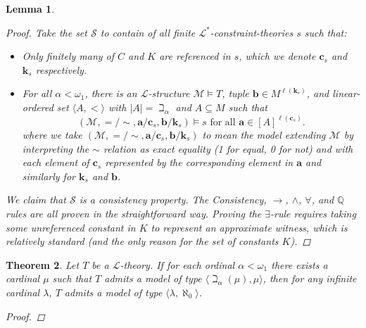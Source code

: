 \documentclass{amsart}
\newtheorem{theorem}{Theorem}[section]
\newtheorem{lemma}[theorem]{Lemma}
\theoremstyle{definition}
\numberwithin{equation}{theorem}
\newcommand{\Q}{\mathbb{Q}}
\newcommand{\V}{\mathbf}
\newcommand{\len}{\ell}
\newcommand{\frag}{\mathcal{L}}
\begin{document}
\begin{lemma}
\begin{proof}
    Take the set $\mathscr{S}$ to contain of all finite $\frag^*$-constraint-theories $s$ such that:
    \begin{itemize}
    \item Only finitely many of $C$ and $K$ are referenced in $s$, which we denote $\V c_s$ and $\V k_s$ respectively.
    \item For all $\alpha<\omega_1$, there is an $\frag$-structure $\mathcal M\models T$, tuple $\V b\in M^{\len(\V k_s)}$, and linear-ordered set $\langle A,<\rangle$ with $|A|=\beth_\alpha$ and $A\subseteq M$ such that 
    \[
      (\mathcal M,{=}/{\sim},\V a/\V c_s, \V b/\V k_s)\models s\text{ for all $\V a\in[A]^{\len(\V c_s)}$}.
    \]
    where we take $(\mathcal M,{=}/{\sim},\V a/\V c_s,\V b/\V k_s)$ to mean the model extending $\mathcal M$ by interpreting the $\sim$ relation as exact equality (1 for equal, 0 for not) and with each element of $\V c_s$ represented by the corresponding element in $\V a$ and similarly for $\V k_s$ and $\V b$.
    \end{itemize}
    We claim that $\mathscr{S}$ is a consistency property.
    The Consistency, $\rightarrow$, $\wedge$, $\forall$, and $\Q$ rules are all proven in the straightforward way.
    Proving the $\exists$-rule requires taking some unreferenced constant in $K$ to represent an approximate witness, which is relatively standard (and the only reason for the set of constants $K$).
    \end{proof}
  \end{lemma}
  \begin{theorem}
    Let $T$ be a $\frag$-theory.
    If for each ordinal $\alpha<\omega_1$ there exists a cardinal $\mu$ such that $T$ admits a model of type $\langle\beth_{\alpha}(\mu),\mu\rangle$, then for any infinite cardinal $\lambda$, $T$ admits a model of type $\langle\lambda,\aleph_0\rangle$.
    \begin{proof}
      
    \end{proof}
  \end{theorem}
\end{document}
